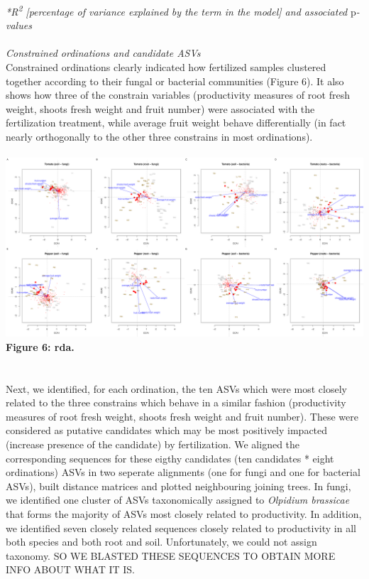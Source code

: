 \documentclass[11pt,]{article}
\begin{document}
\emph{*R\textsuperscript{2} {[}percentage of variance explained by the
term in the model{]} and associated }p\emph{-values} ~\\
\hspace*{0.333em}\\
\emph{Constrained ordinations and candidate ASVs}\\
Constrained ordinations clearly indicated how fertilized samples
clustered together according to their fungal or bacterial communities
(Figure 6). It also shows how three of the constrain variables
(productivity measures of root fresh weight, shoots fresh weight and
fruit number) were associated with the fertilization treatment, while
average fruit weight behave differentially (in fact nearly orthogonally
to the other three constrains in most ordinations).\\
\hspace*{0.333em}\\
\includegraphics{../figures/Figure6_rda.pdf}\\
\textbf{Figure 6: rda.}\\
\hspace*{0.333em}\\
\hspace*{0.333em}\\
Next, we identified, for each ordination, the ten ASVs which were most
closely related to the three constrains which behave in a similar
fashion (productivity measures of root fresh weight, shoots fresh weight
and fruit number). These were considered as putative candidates which
may be most positively impacted (increase presence of the candidate) by
fertilization. We aligned the corresponding sequences for these eigthy
candidates (ten candidates * eight ordinations) ASVs in two seperate
alignments (one for fungi and one for bacterial ASVs), built distance
matrices and plotted neighbouring joining trees. In fungi, we identified
one cluster of ASVs taxonomically assigned to \emph{Olpidium brassicae}
that forms the majority of ASVs most closely related to productivity. In
addition, we identified seven closely related sequences closely related
to productivity in all both species and both root and soil.
Unfortunately, we could not assign taxonomy. SO WE BLASTED THESE
SEQUENCES TO OBTAIN MORE INFO ABOUT WHAT IT IS.
\end{document}
